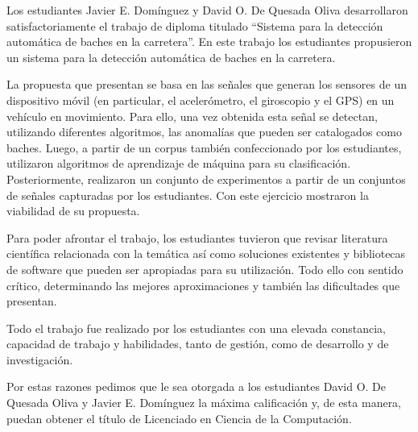 \begin{opinion}
    Los estudiantes Javier E. Domínguez y David O. De Quesada Oliva desarrollaron satisfactoriamente el trabajo de diploma titulado 
    “Sistema para la detección automática de baches en la carretera”. En este trabajo los estudiantes propusieron un sistema para 
    la detección automática de baches en la carretera.

    La propuesta que presentan se basa en las señales que generan los sensores de un dispositivo móvil (en particular, el acelerómetro, 
    el giroscopio y el GPS) en un vehículo en movimiento. Para ello, una vez obtenida esta señal se detectan, utilizando diferentes algoritmos, 
    las anomalías que pueden ser catalogados como baches. Luego, a partir de un corpus también confeccionado por los estudiantes, 
    utilizaron algoritmos de aprendizaje de máquina para su clasificación. Posteriormente, realizaron un conjunto de experimentos a 
    partir de un conjuntos de señales capturadas por los estudiantes. Con este ejercicio mostraron la viabilidad de su propuesta.


    Para poder afrontar el trabajo, los estudiantes tuvieron que revisar literatura científica relacionada con la temática así como soluciones 
    existentes y bibliotecas de software que pueden ser apropiadas para su utilización. Todo ello con sentido crítico, determinando 
    las mejores aproximaciones y también las dificultades que presentan.

    Todo el trabajo fue realizado por los estudiantes con una elevada constancia, capacidad de trabajo y habilidades, tanto de gestión, como 
    de desarrollo y de investigación. 

    Por estas razones pedimos que le sea otorgada a los estudiantes David O. De Quesada Oliva y Javier E. Domínguez la máxima calificación y, 
    de esta manera,  puedan obtener el título de Licenciado en Ciencia de la Computación.
\end{opinion}
